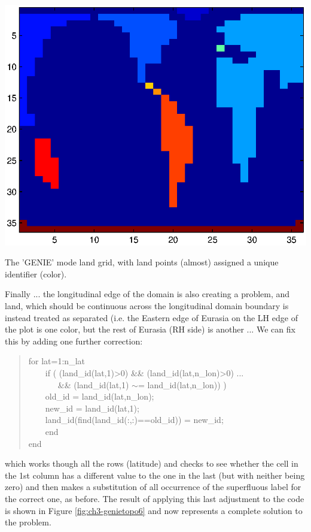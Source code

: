 \documentclass{tufte-book} %
\newenvironment{docspec}{\begin{quotation}\ttfamily\parskip0pt\parindent0pt\ignorespaces}{\end{quotation}}
\begin{document}
\begin{marginfigure}[0.0in]
\includegraphics[width=\linewidth]{ch3-genietopo5.eps}
\caption{The 'GENIE' mode land grid, with land points (almost) assigned a unique identifier (color).}
\label{fig:ch3-genietopo5}
\end{marginfigure}

Finally ... the longitudinal edge of the domain is also creating a problem, and land, which should be continuous across the longitudinal domain boundary is instead treated as separated (i.e. the Eastern edge of Eurasia on the LH edge of the plot is one color, but the rest of Eurasia (RH side) is another ... We can fix this by adding one further  correction:
\begin{docspec}
for lat=1:n\_lat
\\\ \ \ \ if ( (land\_id(lat,1)>0) \&\& (land\_id(lat,n\_lon)>0) ...
\\\ \ \ \ \ \ \ \&\& (land\_id(lat,1) \(\sim\)= land\_id(lat,n\_lon)) )
\\\ \ \ \ old\_id = land\_id(lat,n\_lon);
\\\ \ \ \ new\_id = land\_id(lat,1);
\\\ \ \ \ land\_id(find(land\_id(:,:)==old\_id)) = new\_id;
\\\ \ \ \ end
\\ end
\end{docspec}
which works though all the rows (latitude) and checks to see whether the cell in the 1st column has a different value to the one in the last (but with neither being zero) and then makes a substitution of all occurrence of the superfluous label for the correct one, as before. The result of applying this last adjustment to the code is shown in Figure \ref{fig:ch3-genietopo6} and now represents a complete solution to the problem.
\end{document}
